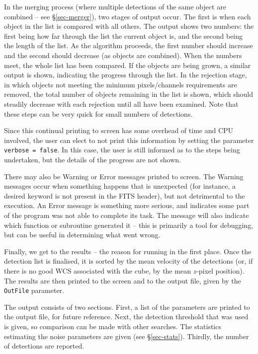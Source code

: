 In the merging process (where multiple detections of the same object
are combined -- see \S\ref{sec-merger}), two stages of output
occur. The first is when each object in the list is compared with all
others. The output shows two numbers: the first being how far through
the list the current object is, and the second being the length of the
list. As the algorithm proceeds, the first number should increase and
the second should decrease (as objects are combined). When the numbers
meet, the whole list has been compared. If the objects are being
grown, a similar output is shown, indicating the progress through the
list. In the rejection stage, in which objects not meeting the minimum
pixels/channels requirements are removed, the total number of objects
remaining in the list is shown, which should steadily decrease with
each rejection until all have been examined. Note that these steps can
be very quick for small numbers of detections.

Since this continual printing to screen has some overhead of time and
CPU involved, the user can elect to not print this information by
setting the parameter \texttt{verbose = false}. In this case, the user
is still informed as to the steps being undertaken, but the details of
the progress are not shown.

There may also be Warning or Error messages printed to screen. The
Warning messages occur when something happens that is unexpected (for
instance, a desired keyword is not present in the FITS header), but
not detrimental to the execution. An Error message is something more
serious, and indicates some part of the program was not able to
complete its task. The message will also indicate which function or
subroutine generated it -- this is primarily a tool for debugging, but
can be useful in determining what went wrong.


\label{sec-results}

Finally, we get to the results -- the reason for running \duchamp in
the first place. Once the detection list is finalised, it is sorted by
the mean velocity of the detections (or, if there is no good WCS
associated with the cube, by the mean $z$-pixel position). The results
are then printed to the screen and to the output file, given by the
\texttt{OutFile} parameter. 

The output consists of two sections. First, a list of the parameters
are printed to the output file, for future reference. Next, the
detection threshold that was used is given, so comparison can be made
with other searches. The statistics estimating the noise parameters
are given (see \S\ref{sec-stats}). Thirdly, the number of detections
are reported.

